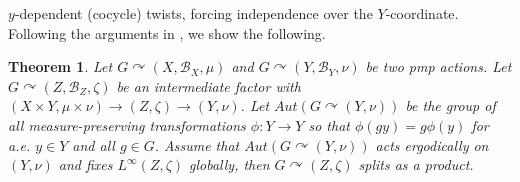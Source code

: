 \documentclass[12pt]{amsart}
\newtheorem{thm}{Theorem}[section]
\theoremstyle{definition}
\begin{document}
$y$-dependent (cocycle) twists, forcing independence over the $Y$-coordinate.
Following the arguments in \cite[Lemma 4.1]{ben-pinsker}, we show the following. 
\begin{thm}
\label{thm:ben}
Let $G\curvearrowright (X,\mathcal{B}_X, \mu)$ and $G\curvearrowright (Y, \mathcal{B}_Y, \nu)$ be two pmp actions. Let $G\curvearrowright (Z,\mathcal{B}_Z, \zeta)$ be an intermediate factor with $(X\times Y,\mu\times \nu)\rightarrow (Z,\zeta)\rightarrow (Y,\nu)$. Let  $Aut(G\curvearrowright (Y,\nu))$ be the group of all measure-preserving transformations $\phi: Y\rightarrow Y$ so that $\phi(gy)=g\phi(y)$ for a.e. $y\in Y$ and all $g\in G$.
Assume that $Aut(G\curvearrowright (Y,\nu))$ acts ergodically on $(Y,\nu)$ and fixes $L^{\infty}(Z,\zeta)$ globally, then $G\curvearrowright (Z,\zeta)$ splits as a product. 
\end{thm}
\end{document}
